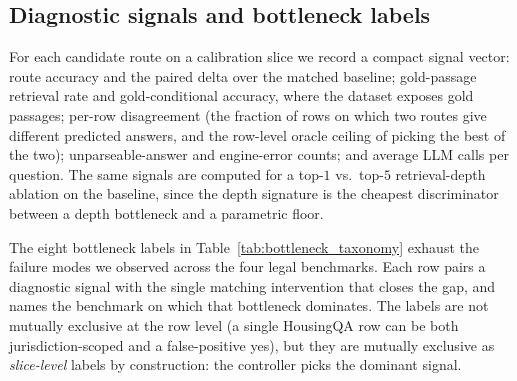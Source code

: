 \subsection{Diagnostic signals and bottleneck labels}\label{sec:method:signals}

For each candidate route on a calibration slice we record a compact
signal vector: route accuracy and the paired delta over the matched
baseline; gold-passage retrieval rate and gold-conditional accuracy,
where the dataset exposes gold passages; per-row disagreement (the
fraction of rows on which two routes give different predicted answers,
and the row-level oracle ceiling of picking the best of the two);
unparseable-answer and engine-error counts; and average LLM calls per
question. The same signals are computed for a top-$1$ vs.\ top-$5$
retrieval-depth ablation on the baseline, since the depth signature is
the cheapest discriminator between a depth bottleneck and a parametric
floor.

The eight bottleneck labels in Table~\ref{tab:bottleneck_taxonomy}
exhaust the failure modes we observed across the four legal benchmarks.
Each row pairs a diagnostic signal with the single matching intervention
that closes the gap, and names the benchmark on which that bottleneck
dominates. The labels are not mutually exclusive at the row level (a single
HousingQA row can be both jurisdiction-scoped and a false-positive yes), but
they are mutually exclusive as \emph{slice-level} labels by construction:
the controller picks the dominant signal.

